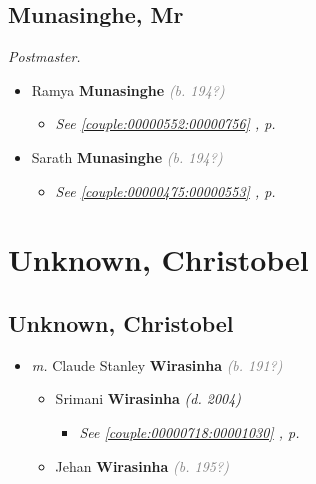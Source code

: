 \documentclass[10pt, openany]{book}
\begin{document}
\chapter{Munasinghe, Mr}
\label{00000550}
\textcolor{slmaroon}{\textit{Postmaster.}}
\begin{itemize}
\item{Ramya \textbf{Munasinghe} \textcolor{gray}{\textit{(b. 194?)}}
\begin{itemize}
\item{\textcolor{slteal}{\textit{See  \autoref{couple:00000552:00000756} \textit{, p. \pageref{couple:00000552:00000756} }}}}
\end{itemize}
 }
\item{Sarath \textbf{Munasinghe} \textcolor{gray}{\textit{(b. 194?)}}
\begin{itemize}
\item{\textcolor{slteal}{\textit{See  \autoref{couple:00000475:00000553} \textit{, p. \pageref{couple:00000475:00000553} }}}}
\end{itemize}
 }
\end{itemize}
 
\part{Unknown, Christobel}
\chapter{Unknown, Christobel}
\label{00000866}
\textcolor{slmaroon}{\textit{}}
\begin{itemize}
\item{\textit{m.} Claude Stanley \textbf{Wirasinha} \textcolor{gray}{\textit{(b. 191?)}}   \label{couple:00000866:00001029} \begin{itemize}
\item{Srimani \textbf{Wirasinha} \textcolor{slorange}{\textit{(d. 2004)}}
\begin{itemize}
\item{\textcolor{slteal}{\textit{See  \autoref{couple:00000718:00001030} \textit{, p. \pageref{couple:00000718:00001030} }}}}
\end{itemize}
 }
\item{Jehan \textbf{Wirasinha} \textcolor{gray}{\textit{(b. 195?)}}
 }
\end{itemize}}
\end{itemize}
 
\end{document}
